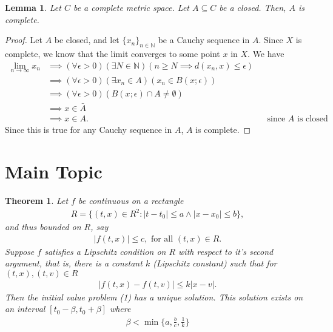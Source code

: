 \documentclass[10pt,a4paper]{article}
\theoremstyle{theorem}
\newtheorem{theorem}{Theorem}
\newtheorem{lemma}{Lemma}
\theoremstyle{definition}
\begin{document}
\begin{lemma}
Let $C$ be a complete metric space. Let $A \subseteq C$ be a closed. Then, $A$ is complete.
\end{lemma}

\begin{proof}
Let $A$ be closed, and let $\{x_n\}_{n \in \mathbb{N}}$ be a Cauchy sequence in $A$.  Since $X$ is complete, we know that the limit converges to some point $x$ in $X$.  We have
\begin{align*}
\lim_{n \to \infty} x_n &\implies (\forall \epsilon > 0)(\exists N \in \mathbb{N})(n \geq N \implies d(x_n, x) \leq \epsilon)\\
&\implies (\forall \epsilon > 0)(\exists x_n \in A)(x_n \in B(x; \epsilon))\\
&\implies (\forall \epsilon > 0)(B(x; \epsilon) \cap A \not = \emptyset)\\
&\implies x \in \bar{A}\\
&\implies x \in A. && \text{since } A \text{ is closed}
\end{align*}
Since this is true for any Cauchy sequence in $A$, $A$ is complete.
\end{proof}

\section{Main Topic}
\begin{theorem}
Let $f$ be continuous on a rectangle 
\begin{align}
R = \{(t, x) \mathbb \in {R}^2 : |t - t_0| \leq a \land |x - x_0| \leq b \},
\end{align}
and thus bounded on $R$, say
\begin{align}
|f(t, x)| \leq c, \text{ for all } (t, x) \in R.
\end{align}
Suppose $f$ satisfies a Lipschitz condition on $R$ with respect to it's second argument, that is, there is a constant $k$ (Lipschitz constant) such that for $(t, x), (t, v) \in R$
\begin{align}
|f(t, x) - f(t, v)| \leq k |x - v|.
\end{align}
Then the initial value problem (1) has a unique solution. This solution exists on an interval $[t_0 - \beta, t_0 + \beta]$ where 
\begin{align}
\beta < \min \Bigg \{a, \frac{b}{c}, \frac{1}{k} \Bigg \}
\end{align}
\end{theorem}
\end{document}
